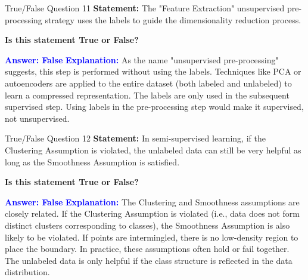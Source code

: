 \documentclass[8pt]{beamer}  %
\begin{document}
	\begin{frame}{True/False Question 11}
		\textbf{Statement:} The "Feature Extraction" unsupervised pre-processing strategy uses the labels to guide the dimensionality reduction process.
		
		\vspace{0.3cm}
		\textbf{Is this statement True or False?}
		
		\vspace{0.2cm}
		\textcolor{blue}{\textbf{Answer: False}}
		\vspace{0.2cm}
		\textcolor{blue}{\textbf{Explanation:}} As the name "unsupervised pre-processing" suggests, this step is performed without using the labels. Techniques like PCA or autoencoders are applied to the entire dataset (both labeled and unlabeled) to learn a compressed representation. The labels are only used in the subsequent supervised step. Using labels in the pre-processing step would make it supervised, not unsupervised.
	\end{frame}
	
	\begin{frame}{True/False Question 12}
		\textbf{Statement:} In semi-supervised learning, if the Clustering Assumption is violated, the unlabeled data can still be very helpful as long as the Smoothness Assumption is satisfied.
		
		\vspace{0.3cm}
		\textbf{Is this statement True or False?}
		
		\vspace{0.2cm}
		\textcolor{blue}{\textbf{Answer: False}}
		\vspace{0.2cm}
		\textcolor{blue}{\textbf{Explanation:}} The Clustering and Smoothness assumptions are closely related. If the Clustering Assumption is violated (i.e., data does not form distinct clusters corresponding to classes), the Smoothness Assumption is also likely to be violated. If points are intermingled, there is no low-density region to place the boundary. In practice, these assumptions often hold or fail together. The unlabeled data is only helpful if the class structure is reflected in the data distribution.
	\end{frame}
	
\end{document}
